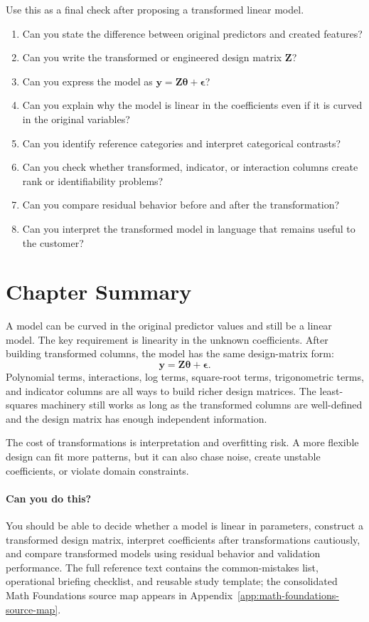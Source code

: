 {Use this as a final check after proposing a transformed linear model.

\begin{enumerate}
  \item Can you state the difference between original predictors and created features?
  \item Can you write the transformed or engineered design matrix \(\mathbf{Z}\)?
  \item Can you express the model as \(\mathbf{y}=\mathbf{Z}\boldsymbol{\theta}+\boldsymbol{\epsilon}\)?
  \item Can you explain why the model is linear in the coefficients even if it is curved in the original variables?
  \item Can you identify reference categories and interpret categorical contrasts?
  \item Can you check whether transformed, indicator, or interaction columns create rank or identifiability problems?
  \item Can you compare residual behavior before and after the transformation?
  \item Can you interpret the transformed model in language that remains useful to the customer?
\end{enumerate}
}{
\section{Chapter Summary}

A model can be curved in the original predictor values and still be a linear model.  The key requirement is linearity in the unknown coefficients.  After building transformed columns, the model has the same design-matrix form:
\begin{equation}
  \mathbf{y}=\mathbf{Z}\boldsymbol{\theta}+\boldsymbol{\epsilon}.
\end{equation}
Polynomial terms, interactions, log terms, square-root terms, trigonometric terms, and indicator columns are all ways to build richer design matrices.  The least-squares machinery still works as long as the transformed columns are well-defined and the design matrix has enough independent information.

The cost of transformations is interpretation and overfitting risk.  A more flexible design can fit more patterns, but it can also chase noise, create unstable coefficients, or violate domain constraints.

\paragraph{Can you do this?}
You should be able to decide whether a model is linear in parameters, construct a transformed design matrix, interpret coefficients after transformations cautiously, and compare transformed models using residual behavior and validation performance.  The full reference text contains the common-mistakes list, operational briefing checklist, and reusable study template; the consolidated Math Foundations source map appears in Appendix~\ref{app:math-foundations-source-map}.
}
